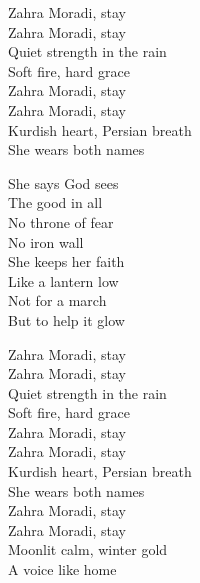 \begin{lyrics}
Zahra Moradi, stay\\
Zahra Moradi, stay\\
Quiet strength in the rain\\
Soft fire, hard grace\\
Zahra Moradi, stay\\
Zahra Moradi, stay\\
Kurdish heart, Persian breath\\
She wears both names

She says God sees\\
The good in all\\
No throne of fear\\
No iron wall\\
She keeps her faith\\
Like a lantern low\\
Not for a march\\
But to help it glow

Zahra Moradi, stay\\
Zahra Moradi, stay\\
Quiet strength in the rain\\
Soft fire, hard grace\\
Zahra Moradi, stay\\
Zahra Moradi, stay\\
Kurdish heart, Persian breath\\
She wears both names\\
Zahra Moradi, stay\\
Zahra Moradi, stay\\
Moonlit calm, winter gold\\
A voice like home
\end{lyrics}

